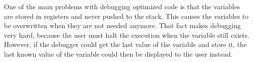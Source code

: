 One of the main problems with debugging optimized code is that the variables are stored in registers and never pushed to the stack.
This causes the variables to be overwritten when they are not needed anymore.
That fact makes debugging very hard, because the user must halt the execution when the variable still exists.
However, if the debugger could get the last value of the variable and store it, the last known value of the variable could then be displayed to the user instead.




